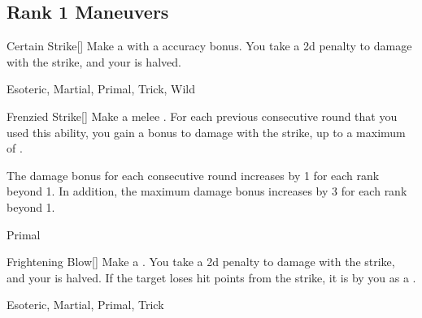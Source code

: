 \subsection{Rank 1 Maneuvers}

\lowercase{\hypertarget{maneuver:Certain Strike}{}}\label{maneuver:Certain Strike}
\hypertarget{maneuver:Certain Strike}{}
\begin{freeability}[Rank 1]{Certain Strike}[]
Make a  with a  accuracy bonus.
You take a \minus2d penalty to damage with the strike, and your  is halved.


 Esoteric, Martial, Primal, Trick, Wild
\end{freeability}
\vspace{0.25em}



\lowercase{\hypertarget{maneuver:Frenzied Strike}{}}\label{maneuver:Frenzied Strike}
\hypertarget{maneuver:Frenzied Strike}{}
\begin{freeability}[Rank 1]{Frenzied Strike}[]
Make a melee .
For each previous consecutive round that you used this ability, you gain a  bonus to damage with the strike, up to a maximum of .

\rankline
The damage bonus for each consecutive round increases by 1 for each rank beyond 1.
In addition, the maximum damage bonus increases by 3 for each rank beyond 1.


 Primal
\end{freeability}
\vspace{0.25em}



\lowercase{\hypertarget{maneuver:Frightening Blow}{}}\label{maneuver:Frightening Blow}
\hypertarget{maneuver:Frightening Blow}{}
\begin{freeability}[Rank 1]{Frightening Blow}[]
Make a .
You take a \minus2d penalty to damage with the strike, and your  is halved.
If the target loses hit points from the strike, it is  by you as a .


 Esoteric, Martial, Primal, Trick
\end{freeability}
\vspace{0.25em}



